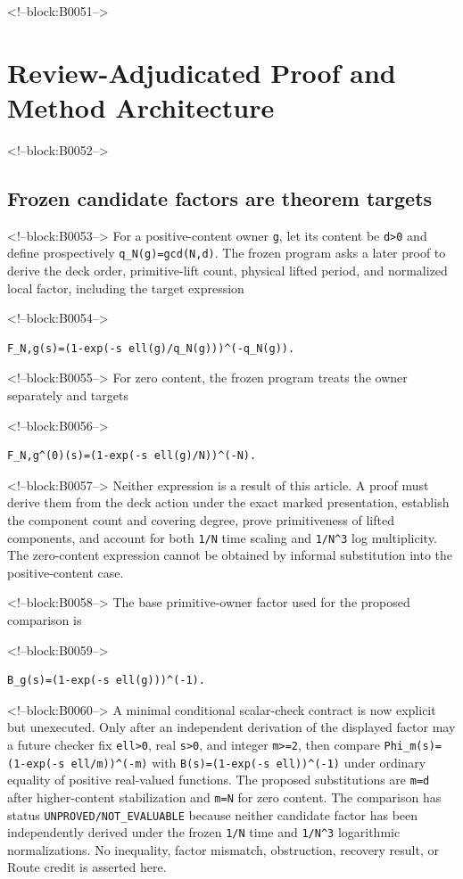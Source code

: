 \documentclass[11pt]{article}
\begin{document}
<!--block:B0051-->
\hypertarget{4-review-adjudicated-proof-and-method-architecture}{%
\section{Review-Adjudicated Proof and Method
Architecture}\label{4-review-adjudicated-proof-and-method-architecture}}

<!--block:B0052-->
\hypertarget{41-frozen-candidate-factors-are-theorem-targets}{%
\subsection{Frozen candidate factors are theorem
targets}\label{41-frozen-candidate-factors-are-theorem-targets}}

<!--block:B0053-->
For a positive-content owner \texttt{g}, let its content be
\texttt{d\textgreater{}0} and define prospectively
\texttt{q\_N(g)=gcd(N,d)}. The frozen program asks a later proof to
derive the deck order, primitive-lift count, physical lifted period, and
normalized local factor, including the target expression

<!--block:B0054-->
\begin{verbatim}
F_N,g(s)=(1-exp(-s ell(g)/q_N(g)))^(-q_N(g)).
\end{verbatim}

<!--block:B0055-->
For zero content, the frozen program treats the owner separately and
targets

<!--block:B0056-->
\begin{verbatim}
F_N,g^(0)(s)=(1-exp(-s ell(g)/N))^(-N).
\end{verbatim}

<!--block:B0057-->
Neither expression is a result of this article. A proof must derive them from
the deck action under the exact marked presentation, establish the
component count and covering degree, prove primitiveness of lifted
components, and account for both \texttt{1/N} time scaling and
\texttt{1/N\^{}3} log multiplicity. The zero-content expression cannot
be obtained by informal substitution into the positive-content case.

<!--block:B0058-->
The base primitive-owner factor used for the proposed comparison is

<!--block:B0059-->
\begin{verbatim}
B_g(s)=(1-exp(-s ell(g)))^(-1).
\end{verbatim}

<!--block:B0060-->
A minimal conditional scalar-check contract is now explicit but unexecuted.
Only after an independent derivation of the displayed factor may a future
checker fix \texttt{ell>0}, real \texttt{s>0}, and integer \texttt{m>=2}, then
compare \texttt{Phi\_m(s)=(1-exp(-s ell/m))^(-m)} with
\texttt{B(s)=(1-exp(-s ell))^(-1)} under ordinary equality of positive
real-valued functions. The proposed substitutions are \texttt{m=d} after
higher-content stabilization and \texttt{m=N} for zero content. The comparison
has status \texttt{UNPROVED/NOT\_EVALUABLE} because neither candidate factor
has been independently derived under the frozen \texttt{1/N} time and
\texttt{1/N^3} logarithmic normalizations. No inequality, factor mismatch,
obstruction, recovery result, or Route credit is asserted here.
\end{document}
